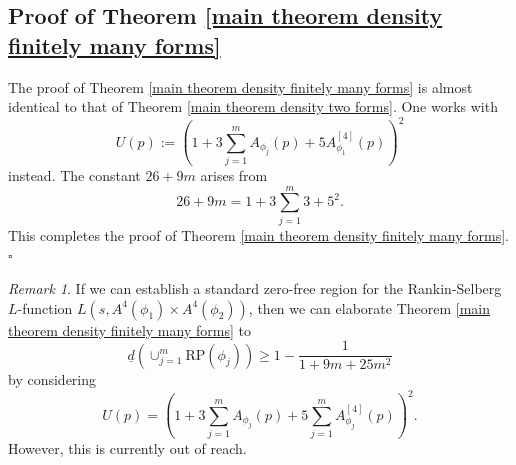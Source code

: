 \documentclass[10pt,leqno]{amsart}
\theoremstyle{plain}
\theoremstyle{definition}
\theoremstyle{remark}
\newtheorem*{remark}{Remark}
\numberwithin{equation}{section}
\newcommand{\RP}{\text{RP}}
\begin{document}
\subsection{Proof of Theorem \ref{main theorem density finitely many forms}}
The proof of Theorem \ref{main theorem density finitely many forms} is almost identical to that of Theorem \ref{main theorem density two forms}. One works with 
$$U(p) := (1+3\sum_{j=1}^m A_{\phi_j}(p)+5A^{[4]}_{\phi_1}(p))^2$$
instead. The constant $26+9m$ arises from 
$$26+9m = 1+3\sum_{j=1}^m 3 + 5^2.$$
This completes the proof of Theorem \ref{main theorem density finitely many forms}. $\square$


\begin{remark}
     If we can establish a standard zero-free region for the Rankin-Selberg $L$-function $L(s,A^4(\phi_1) \times A^4(\phi_2))$, then we can elaborate Theorem \ref{main theorem density finitely many forms} to 
\begin{equation}
     \underline{d}(\cup_{j=1}^m \RP(\phi_j)) \geq 1-\frac{1}{1+9m+25m^2}
    \end{equation}
by considering 
$$U(p) = (1+3\sum_{j=1}^mA_{\phi_j}(p)+5\sum_{j=1}^mA_{\phi_j}^{[4]}(p))^2.$$
However, this is currently out of reach. 
\end{remark}

\bigskip 



\end{document}
